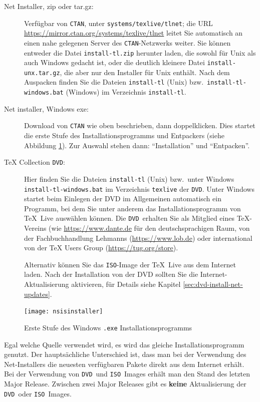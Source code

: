 \documentclass[12pt,ngerman,a4paper,fullparskip]{report}
\newcommand{\TL}{\TeX\ Live\xspace}
\newcommand{\acro}[1]{\texttt{#1}}
\newcommand{\code}[1]{\texttt{#1}}
\newcommand{\filename}[1]{\texttt{#1}}
\newcommand{\dirname}[1]{\texttt{#1}}
\providecommand*{\CTAN}{\acro{CTAN}\xspace}
\providecommand*{\DVD}{\acro{DVD}\xspace}
\providecommand*{\ISO}{\acro{ISO}\xspace}
\begin{document}
\begin{description}
\item [Net Installer, zip oder tar.gz:] Verfügbar von \CTAN, unter
\dirname{systems/texlive/tlnet}; die URL
\url{https://mirror.ctan.org/systems/texlive/tlnet} leitet Sie automatisch
an einen nahe gelegenen Server des \CTAN-Netzwerks weiter.
Sie können entweder die Datei \filename{install-tl.zip} herunter laden,
die sowohl für Unix als auch Windows gedacht ist,
oder die deutlich kleinere Datei \filename{install-unx.tar.gz},
die aber nur den Installer für Unix enthält.
Nach dem Auspacken finden Sie die Dateien \filename{install-tl} (Unix)
bzw.\ \filename{install-tl-windows.bat} (Windows) im Verzeichnis \dirname{install-tl}.

\item[Net installer, Windows exe:] Download von \CTAN{} wie oben beschrieben, dann doppelklicken. Dies startet
die erste Stufe des Installationsprogramms und Entpackers (siehe Abbildung \ref{fig:nsis}). Zur Auswahl stehen dann: 
\enquote{Installation} und \enquote{Entpacken}.


\item [\TeX{} Collection \DVD:] Hier finden Sie die Dateien \filename{install-tl} (Unix)
bzw.\  unter Windows \filename{install-tl-windows.bat} im Verzeichnis \dirname{texlive}
der \DVD. Unter Windows startet beim Einlegen der DVD im Allgemeinen automatisch ein Programm, bei dem Sie unter anderem das Installationsprogramm von \TL auswählen können.  Die \DVD\ erhalten Sie als Mitglied eines \TeX-Vereins (wie \url{https://www.dante.de} für den deutschsprachigen Raum, von der Fachbuchhandlung Lehmanns (\url{https://www.lob.de}) oder international von der \TeX{} Users Group (\url{https://tug.org/store}). 

Alternativ können Sie das \ISO-Image der \TL aus dem Internet laden. Nach der Installation von der DVD sollten Sie die Internet-Aktualisierung aktivieren, für Details siehe Kapitel \ref{sec:dvd-install-net-updates}.
\end{description}

\begin{figure}[tb]
\centering
\texttt{[image: nsisinstaller]}
\caption{Erste Stufe des Windows \code{.exe} Installationsprogramms}\label{fig:nsis}
\end{figure}

Egal welche Quelle verwendet wird, es wird das gleiche Installationsprogramm genutzt. Der hauptsächliche Unterschied ist, dass man bei der Verwendung des Net-Installers die neuesten verfügbaren Pakete direkt aus dem Internet erhält. Bei der Verwendung von \DVD\ und \ISO\ Images erhält man den Stand des letzten Major Release. Zwischen zwei Major Releases gibt es \textbf{keine} Aktualisierung der \DVD\ oder \ISO\ Images.
\end{document}
